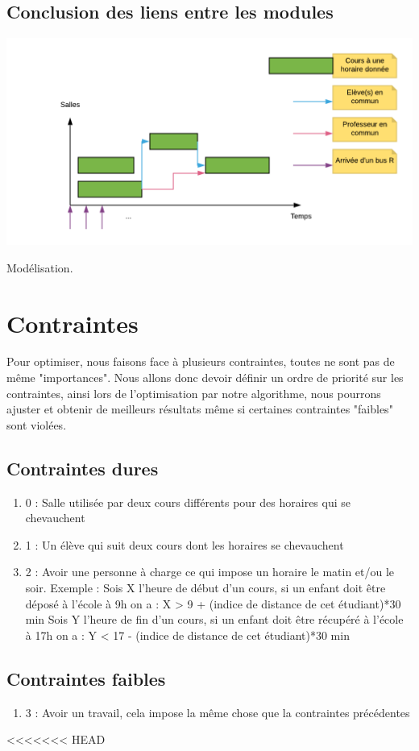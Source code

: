 \documentclass[a4paper,11pt]{article}
\begin{document}
	\subsection{Conclusion des liens entre les modules}
		\centerline{\includegraphics[scale=0.5]{modelter.png}}
		Modélisation.\\

\section{Contraintes}
	Pour optimiser, nous faisons face à plusieurs contraintes, toutes ne sont pas 
	de même "importances". Nous allons donc devoir définir un ordre de priorité sur 
	les contraintes, ainsi lors de l'optimisation par notre algorithme, nous 
	pourrons ajuster et obtenir de meilleurs résultats même si certaines contraintes
	"faibles" sont violées.\\
	\subsection{Contraintes dures}
		\begin{enumerate}
			\item 0 : Salle utilisée par deux cours différents pour des horaires 
			qui se chevauchent
			\item 1 : Un élève qui suit deux cours dont les horaires se chevauchent
			\item 2 : Avoir une personne à charge ce qui impose un horaire le matin et/ou le soir.
			Exemple : Sois X l'heure de début d'un cours, si un enfant doit être déposé à l'école à 9h on a : X > 9 + (indice de distance de cet étudiant)*30 min
			Sois Y l'heure de fin d'un cours, si un enfant doit être récupéré à l'école à 17h on a : Y < 17 - (indice de distance de cet étudiant)*30 min			
		\end{enumerate}
	\subsection{Contraintes faibles}
		\begin{enumerate}
			\item 3 : Avoir un travail, cela impose la même chose que la contraintes précédentes
		\end{enumerate}
<<<<<<< HEAD
\end{document}
